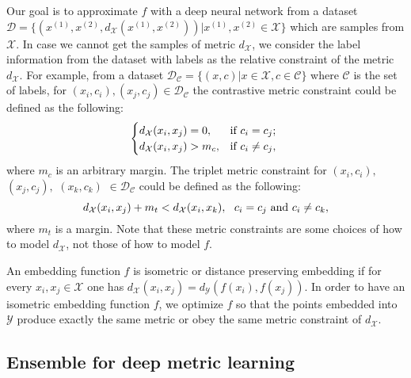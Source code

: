 \documentclass[runningheads]{llncs}
\begin{document}
Our goal is to approximate $f$ with a deep neural network
 from a dataset $\mathcal{D}=\{(x^{(1)},x^{(2)},d_\mathcal{X}  (x^{(1)},x^{(2)} ))|x^{(1)},x^{(2)}\in \mathcal{X} \}$
 which are samples from $\mathcal{X} $. In case we cannot get the samples of metric $d_\mathcal{X} $,
 we consider the label information from the dataset with labels as the relative constraint of the metric $d_\mathcal{X} $.
For example, from a dataset $\mathcal{D}_\mathcal{C}=\{(x,c)|x\in \mathcal{X} ,c\in \mathcal{C}\}$ where $\mathcal{C}$ is the set of labels,
     for $(x_i,c_i ),(x_j,c_j )\in \mathcal{D}_\mathcal{C} $
 the contrastive metric constraint could be defined as the following:
\begin{equation}
 \begin{cases}
 d_\mathcal{X} (x_i,x_j ) =0 , &\text{if $c_i=c_j $; } \\
 d_\mathcal{X} (x_i,x_j )>m_c, &\text{if $c_i\neq c_j$,}
 \end{cases}
\vspace{-1mm}
\label{eq:contrastive_metric}
\end{equation}
where $m_c$ is an arbitrary margin.
The triplet metric constraint
 for $(x_i,c_i ),$ $(x_j,c_j ),$ $(x_k,c_k )$ $\in \mathcal{D}_\mathcal{C} $
 could be defined as the following:
\vspace{-2mm}
\begin{equation}
   d_\mathcal{X} (x_i,x_j) +m_t <d_\mathcal{X}  (x_i,x_k), \text{~~$c_i=c_j $ and $c_i \neq c_k $},
\label{eq:triplet_metric}
\vspace{-3mm}
\end{equation}
 where $m_t$ is a margin.
Note that these metric constraints are some choices of how to model $d_\mathcal{X} $, not those of how to model $f$.

An embedding function $f$ is isometric or distance preserving embedding if for every $x_i,x_j \in \mathcal{X}$ one has $d_\mathcal{X}  (x_i,x_j )=d_\mathcal{Y} (f(x_i),f(x_j) )$.
In order to have an isometric embedding function $f$, 
we optimize $f$ so that the points embedded into $\mathcal{Y}$ produce exactly the same metric or obey the same metric constraint of $d_\mathcal{X}$.

\vspace{-4mm}
\subsection{Ensemble for deep metric learning}
\label{sec:ensemble_dml}
\vspace{-1mm}
\end{document}
